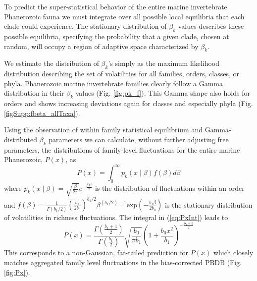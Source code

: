 \documentclass[12pt]{article}
\begin{document}
To predict the super-statistical behavior of the entire marine
invertebrate Phanerozoic fauna we must integrate over all possible
local equilibria that each clade could experience. The stationary
distribution of $\beta_k$ values describes these possible equilibria,
specifying the probability that a given clade, chosen at random, will
occupy a region of adaptive space characterized by $\beta_k$.


We estimate the distribution of $\beta_k$'s simply as the maximum
likelihood distribution describing the set of volatilities for all
families, orders, classes, or phyla. Phanerozoic marine invertebrate
families clearly follow a Gamma distribution in their $\beta_k$ values
(Fig. \ref{fig:pk_f}). This Gamma shape also holds for orders and
shows increasing deviations again for classes and especially phyla
(Fig. \ref{figSupp:fbeta_allTaxa}).

Using the observation of within family statistical equilibrium and
Gamma-distributed $\beta_k$ parameters we can calculate, without
further adjusting free parameters, the distributions of family-level
fluctuations for the entire marine Phanerozoic, $P(x)$, as
\begin{equation}
  P(x) = \int_0^\infty p_k(x \mid \beta) f(\beta) d\beta \label{eq:PxInt}
\end{equation}
where
$p_k(x \mid \beta) = \sqrt{\frac{\beta}{2\pi}} e^{-\frac{\beta
    x^2}{2}}$ is the distribution of fluctuations within an order and
$f(\beta) = \frac{1}{\Gamma(b_1/2)}
\left(\frac{b_1}{2b_0}\right)^{b_1/2} \beta^{(b_1/2) - 1}
\text{exp}\left(-\frac{b_1 \beta}{2 b_0}\right)$ is the stationary
distribution of volatilities in richness fluctuations. The integral in
(\ref{eq:PxInt}) leads to
\begin{equation}
  \label{eq:Px}
  P(x) = \frac{\Gamma\left(\frac{b_1 +
        1}{2}\right)}{\Gamma\left(\frac{b_1}{2}\right)}
  \sqrt{\frac{b_0}{\pi b_1}} \left(1 + \frac{b_0
      x^2}{b_1}\right)^{-\frac{b_1 + 1}{2}}
\end{equation}
This corresponds to a non-Gaussian, fat-tailed prediction for $P(x)$
which closely matches aggregated family level fluctuations in the
bias-corrected PBDB (Fig. \ref{fig:Px}).
\end{document}
